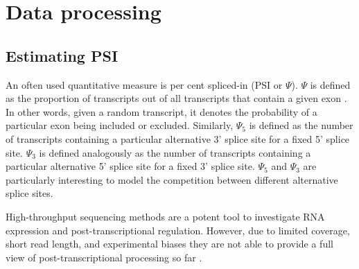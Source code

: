 \section{Data processing}\label{sec:dataprocessing}
\subsection{Estimating PSI} \label{subsec:psiestimation}
An often used quantitative measure is per cent spliced-in (PSI or $\Psi$).
$\Psi$ is defined as the proportion of transcripts out of all transcripts that contain a given exon \cite{psi}. In other words, given a random transcript, it denotes the probability of a particular exon being included or excluded.
Similarly, $\Psi_5$ is defined as the number of transcripts containing a particular alternative 3' splice site for a fixed 5' splice site. $\Psi_3$ is defined analogously as the number of transcripts containing a particular alternative 5' splice site for a fixed 3' splice site. $\Psi_5$ and $\Psi_3$ are particularly interesting to model the competition between different alternative splice sites.



High-throughput sequencing methods are a potent tool to investigate RNA expression and post-transcriptional regulation. However, due to limited coverage, short read length, and experimental biases they are not able to provide a full view of post-transcriptional processing so far \cite{berlinpsi}.

